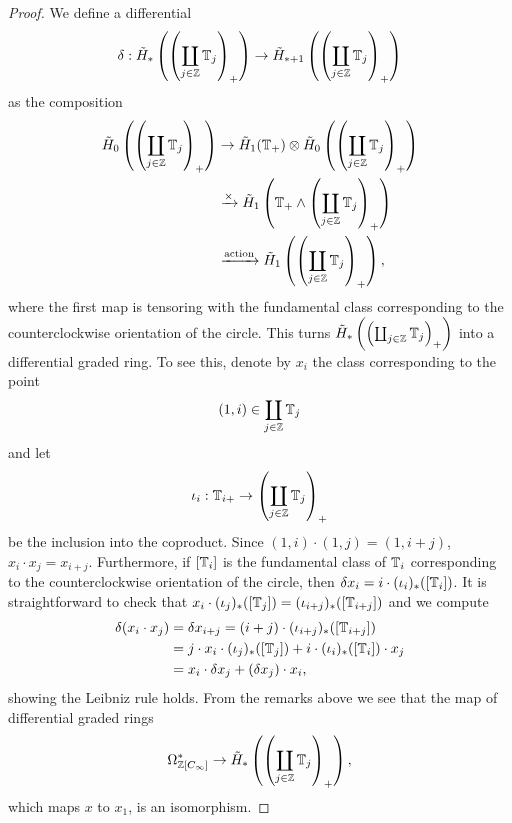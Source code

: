 \begin{proof}
We define a differential  
\[
\delta:\tilde H_\ast\left(\left( \coprod_{j\in \mathbb{Z}} \mathbb{T}_j \right)_+\right)\to \tilde H_{\ast+1}\left(\left( \coprod_{j\in \mathbb{Z}} \mathbb{T}_j \right)_+\right)
\]
 as the composition
\begin{align*}
\tilde  H_0\left(\left( \coprod_{j\in \mathbb{Z}} \mathbb{T}_j \right)_+\right)
&\to \tilde H_1(\mathbb{T}_+)\otimes  \tilde H_0\left(\left( \coprod_{j\in \mathbb{Z}} \mathbb{T}_j \right)_+\right)\\
&\xrightarrow{\times}
\tilde  H_1\left(\mathbb{T}_+\wedge\left( \coprod_{j\in \mathbb{Z}} \mathbb{T}_j \right)_+\right)\\
&\xrightarrow{\mathrm{action}}
\tilde H_1\left(\left( \coprod_{j\in \mathbb{Z}} \mathbb{T}_j \right)_+\right),
\end{align*}
where the first map is tensoring with the fundamental class
corresponding to the counterclockwise orientation
of the circle. This turns $\tilde H_\ast\left(\left( \coprod_{j\in \mathbb{Z}} \mathbb{T}_j \right)_+\right)$
into a differential graded ring.
To see this, denote by $x_i$ the class corresponding to the point
\[
(1,i)\in \coprod_{j\in \mathbb{Z}} \mathbb{T}_j
\]
and let 
\[
\iota_i:\mathbb{T}_{i+}\to \left( \coprod_{j\in \mathbb{Z}} \mathbb{T}_j \right)_+
\]
be the inclusion into the coproduct. Since $(1,i)\cdot (1,j) = (1,i+j)$, $x_i\cdot x_j = x_{i+j}$.
Furthermore, if $[\mathbb{T}_i]$ is the fundamental class of $\mathbb{T}_i$ corresponding to the counterclockwise
orientation of the circle, then $\delta x_i = i\cdot (\iota_i)_\ast([\mathbb{T}_i])$. It is straightforward to check
that $x_i\cdot (\iota_j)_\ast([\mathbb{T}_j]) = (\iota_{i+j})_\ast([\mathbb{T}_{i+j}])$ and we compute
\begin{align*}
\delta(x_i\cdot x_j) &= \delta x_{i+j} =    (i+j)\cdot (\iota_{i+j})_\ast([\mathbb{T}_{i+j}]) \\
&= j\cdot  x_i\cdot (\iota_j)_\ast([\mathbb{T}_j])+ i\cdot(\iota_i)_\ast([\mathbb{T}_i])\cdot x_j\\
&= x_i\cdot \delta x_j + (\delta x_j)\cdot x_i,
\end{align*}
showing the Leibniz rule holds.
From the remarks above we see that the map of differential graded rings 
\[
\Omega^\ast_{\mathbb{Z}[C_\infty]}\to
\tilde H_\ast\left(\left( \coprod_{j\in \mathbb{Z}} \mathbb{T}_j \right)_+\right),
\]
 which maps $x$ to $x_1$, is an isomorphism. 




\end{proof}
